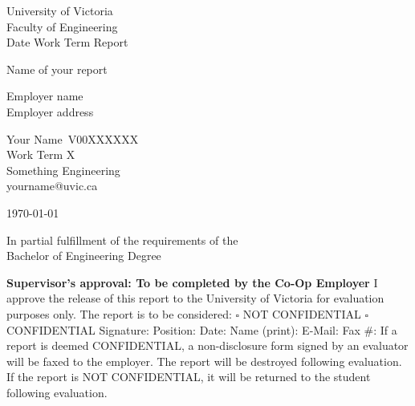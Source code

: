 \documentclass[11pt]{article}
\providecommand{\blankline}{\underline{\hspace{3cm}}}
\newenvironment{ApprovalBox}
	{ %
		\begin{framed}			
		\begin{scriptsize}
		\begin{flushleft}
		\begin{small}
	}
	{ %
		\end{small}
		\end{flushleft}
		\end{scriptsize}
		\end{framed}
	}
\begin{document}
\begin{center}
University of Victoria\\
Faculty of Engineering\\
Date Work Term Report\\
\vspace{1cm}

{\huge Name of your report}\\
\vspace{1cm}

Employer name \\
Employer address\\
\vspace{1cm}

Your Name\
V00XXXXXX\\
Work Term X\\
Something Engineering\\
yourname@uvic.ca\\
\vspace{0.5cm}

\today \\
\vspace{1cm}

In partial fulfillment of the requirements of the\\
Bachelor of Engineering Degree\\
\vspace{4cm}



\begin{ApprovalBox}
	\textbf{Supervisor's approval: To be completed by the Co-Op Employer} 
	\newline\newline
	I approve the release of this report to the University of Victoria for evaluation purposes only. 
	\newline\newline
	The report is to be considered: \quad $\square${} NOT CONFIDENTIAL \quad $\square${} CONFIDENTIAL
	\newline\newline
	Signature: \blankline{} Position: \blankline{} Date: \blankline{} \newline\newline
	Name (print): \blankline{} E-Mail: \blankline{} Fax \#: \blankline{} 
	\newline\newline
	If a report is deemed CONFIDENTIAL, a non-disclosure form signed by an evaluator will be faxed to the employer. The report will be destroyed following evaluation. If the report is NOT CONFIDENTIAL, it will be returned to the student following evaluation.
\end{ApprovalBox}

\end{center}
\restoregeometry		%
\end{document}
